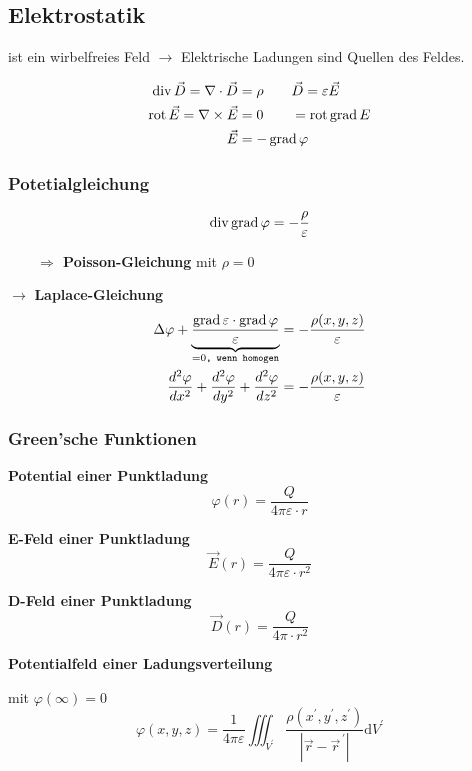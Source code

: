 \subsection{Elektrostatik}
ist ein wirbelfreies Feld $\rightarrow$ Elektrische Ladungen sind Quellen des
Feldes.

\begin{align*}
    \operatorname{div} \vec{D} = \nabla \cdot \vec{D}  & = \rho       \qquad          \vec{D} = \varepsilon \vec{E} \\
    \operatorname{rot} \vec{E} = \nabla \times \vec{E} & = 0          \qquad          = \operatorname{rot} \operatorname{grad} E            \\
    \vec{E}                                & =- \operatorname{grad} \varphi
\end{align*}
\subsubsection{Potetialgleichung}
\[
    \operatorname{div} \operatorname{grad} \varphi = - \dfrac{\rho}{\varepsilon}
\]

\textbf{$\qquad \Rightarrow$ Poisson-Gleichung} mit $\rho = 0$

$\rightarrow$ \textbf{Laplace-Gleichung}
\begin{align*}
    \Delta \varphi + \underbrace{ \dfrac{\operatorname{grad} \varepsilon \cdot \operatorname{grad} \varphi}{\varepsilon}}_{= 0\texttt{, wenn homogen}}
     & = - \dfrac{\rho (x, y, z)}{\varepsilon} \\
    \frac{d^2 \varphi}{d x^2} + \frac{d^2 \varphi}{d y^2} + \frac{d^2 \varphi}{d z^2}
     & = - \dfrac{\rho (x, y, z)}{\varepsilon}
\end{align*}

\subsubsection{Green'sche Funktionen}
\textbf{Potential einer Punktladung}
\[ \varphi (r) = \dfrac{Q}{4 \pi \varepsilon \cdot r} \]

\textbf{E-Feld einer Punktladung}
\[ \vec{E}(r) = \dfrac{Q}{4 \pi \varepsilon \cdot r^2} \]

\textbf{D-Feld einer Punktladung}
\[ \vec{D}(r) = \dfrac{Q}{4 \pi \cdot r^2} \]

\textbf{Potentialfeld einer Ladungsverteilung}

mit $\varphi(\infty)=0$
\[
    \varphi(x, y, z)=\frac{1}{4 \pi \varepsilon} \iiint_{V^{\prime}}
    \frac{\rho\left(x^{\prime}, y^{\prime},
        z^{\prime}\right)}{\left|\vec{r}-\vec{r}^{\,\prime}\right|} \mathrm{d}
    V^{\prime}
\]


